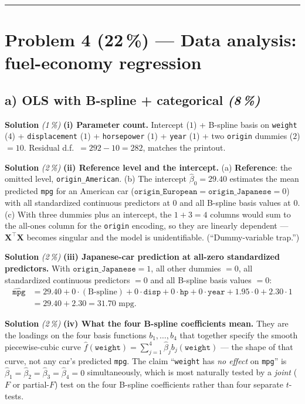 \documentclass[11pt,a4paper]{article}
\newcommand{\points}[1]{\textbf{(#1\,\%)}}
\newcommand{\subpoints}[1]{\textit{(#1\,\%)}}
\newcommand{\sol}{\noindent\textbf{Solution}}
\begin{document}
\vspace{0.6em}
\hrule
\vspace{1em}

\section*{Problem 4 \points{22} --- Data analysis: fuel-economy regression}

\subsection*{a) OLS with B-spline + categorical \subpoints{8}}

\sol{} \subpoints{1} \textbf{(i) Parameter count.} Intercept ($1$) + B-spline basis on \texttt{weight}
($4$) + \texttt{displacement} ($1$) + \texttt{horsepower} ($1$) + \texttt{year} ($1$) + two
\texttt{origin} dummies ($2$) $= \boxed{10}$. Residual d.f.\ $= 292 - 10 = 282$, matches the
printout. \checkmark

\medskip
\sol{} \subpoints{2} \textbf{(ii) Reference level and the intercept.} (a) \textbf{Reference}: the
omitted level, \texttt{origin\_American}. (b) The intercept $\hat\beta_0 = 29.40$ estimates the
mean predicted \texttt{mpg} for an American car ($\texttt{origin\_European} = \texttt{origin\_Japanese} = 0$)
with all standardized continuous predictors at $0$ and all B-spline basis values at $0$. (c) With
three dummies plus an intercept, the $1 + 3 = 4$ columns would sum to the all-ones column for the
\texttt{origin} encoding, so they are linearly dependent --- $\mathbf{X}^\top\mathbf{X}$ becomes
singular and the model is unidentifiable. (``Dummy-variable trap.'')

\medskip
\sol{} \subpoints{2} \textbf{(iii) Japanese-car prediction at all-zero standardized predictors.}
With $\texttt{origin\_Japanese}=1$, all other dummies $=0$, all standardized continuous predictors
$=0$ and all B-spline basis values $=0$:
\begin{align*}
\widehat{\texttt{mpg}} &= 29.40 + 0\cdot(\text{B-spline}) + 0\cdot\texttt{disp} + 0\cdot\texttt{hp}
                          + 0\cdot\texttt{year} + 1.95\cdot 0 + 2.30\cdot 1 \\
   &= 29.40 + 2.30 = \boxed{31.70} \text{ mpg}.
\end{align*}

\medskip
\sol{} \subpoints{2} \textbf{(iv) What the four B-spline coefficients mean.} They are the loadings
on the four basis functions $b_1, \dots, b_4$ that together specify the smooth piecewise-cubic
curve $\hat f(\texttt{weight}) = \sum_{j=1}^4 \hat\beta_j b_j(\texttt{weight})$ --- the shape of
that curve, not any car's predicted \texttt{mpg}. The claim ``\texttt{weight} has \emph{no effect}
on \texttt{mpg}'' is $\hat\beta_1 = \hat\beta_2 = \hat\beta_3 = \hat\beta_4 = 0$ simultaneously,
which is most naturally tested by a \emph{joint} ($F$ or partial-$F$) test on the four B-spline
coefficients rather than four separate $t$-tests.
\end{document}

